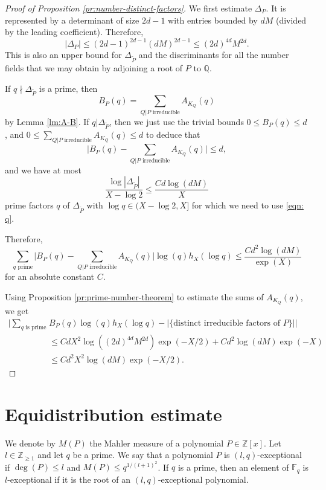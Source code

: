 \documentclass[12pt, notitlepage]{amsart}
\numberwithin{equation}{section}
\def\Q{\mathbb Q}
\def\Z{\mathbb Z}
\def\F{\mathbb F}
\def\wt{\widetilde}
\theoremstyle{remark}
\theoremstyle{definition}
\theoremstyle{remark}
\numberwithin{equation}{section}
\begin{document}
\begin{proof}[Proof of Proposition \ref{pr:number-distinct-factors}]
We first estimate $\Delta_P$.
It is represented by a determinant of size $2d-1$ with entries bounded by $dM$
(divided by the leading coefficient).
Therefore,
\[
|\Delta_P|\le (2d-1)^{2d-1} (dM)^{2d-1}\le (2d)^{4d} M^{2d}.
\]
This is also an upper bound for $\Delta_{\wt P}$ and
the discriminants for all the number fields that
we may obtain by adjoining a root of $P$ to $\Q$.

If $q\nmid \Delta_{\wt P}$ is a prime, then
\[
B_P(q)=\sum_{\text{$Q|P$ irreducible}} A_{K_Q}(q)
\]
by Lemma \ref{lm:A-B}.
If $q|\Delta_{\wt P}$, then we just use the trivial bounds $0 \le B_P(q) \le d$, and $0\le \sum_{\text{$Q|P$ irreducible}} A_{K_Q}(q) \le d$ to deduce that
\begin{equation}\label{eqn: q}
\Big|B_P(q)-\sum_{\text{$Q|P$ irreducible}} A_{K_Q}(q)\Big|\le d, 
\end{equation}
and we have at most
\[
\frac{\log |\Delta_{\wt P}|}{X-\log 2}\le \frac{Cd\log (dM)}{X}
\]
prime factors $q$ of $\Delta_{\wt P}$ with $\log q \in (X-\log 2, X]$ for which we need to use
\eqref{eqn: q}.

Therefore,
\[
\sum_{\text{$q$ prime}}\Big|B_P(q)-\sum_{\text{$Q|P$ irreducible}} A_{K_Q}(q)\Big|
\log (q) h_X(\log q)
\le \frac{C d^2\log(dM)}{\exp(X)}
\]
for an absolute constant $C$.

Using Proposition \ref{pr:prime-number-theorem} to estimate the sums of $A_{K_Q}(q)$,
we get
\begin{align*}
\Big|\sum_{\text{$q$ is prime}} &B_P(q)\log(q)h_X(\log q)
-|\{\text{distinct irreducible factors of $P$}\}|\Big|\\
&\le Cd X^2\log((2d)^{4d}M^{2d})\exp(-X/2)+Cd^2\log(dM)\exp(-X)\\
&\le C d^2 X^2\log (dM)\exp(-X/2).
\end{align*}
\end{proof}

\section{Equidistribution estimate}
\label{sc:equidistribution}

We denote by $M(P)$ the Mahler measure of a polynomial $P\in\Z[x]$.
Let $l\in\Z_{\ge 1}$ and let $q$ be a prime.
We say that a polynomial $P$ is $(l,q)$-exceptional if $\deg(P)\le l$ and $M(P)\le q^{1/(l+1)^2}$.
If $q$ is a prime, then an element of $\F_q$ is $l$-exceptional if it
is the root of an $(l,q)$-exceptional polynomial.
\end{document}
